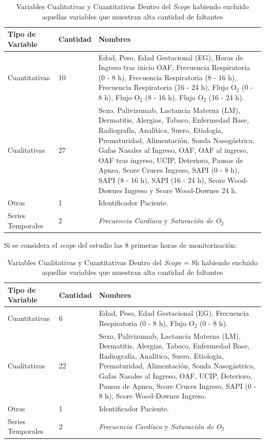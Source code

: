 \begin{table}[H]
    \centering
        \begin{tabular}{| m{5cm} | m{1.75cm} | m{7cm} |}
            \hline Tipo de Variable & Cantidad & Nombres  \\ \hline
            Cuantitativas & 10 & Edad, Peso, Edad Gestacional (EG), Horas de Ingreso tras inicio OAF, Frecuencia Respiratoria (0 - 8 h), Frecuencia Respiratoria (8 - 16 h),
            Frecuencia Respiratoria (16 - 24 h),
            Flujo O$_2$ (0 - 8 h),
            Flujo O$_2$ (8 - 16 h),
            Flujo O$_2$ (16 - 24 h). \\ \hline
            Cualitativas & 27 & Sexo, Palivizumab, Lactancia Materna (LM), Dermatitis, Alergias, Tabaco, Enfermedad Base, Radiografía, Analítica, Suero, Etiología, Prematuridad, Alimentación, Sonda Nasogástrica, Gafas Nasales al Ingreso, OAF, OAF al ingreso, OAF tras ingreso, UCIP, Deterioro, Pausas de Apnea, Score Cruces Ingreso, SAPI (0 - 8 h),
            SAPI (8 - 16 h), 
            SAPI (16 - 24 h), Score Wood-Downes Ingreso y Score Wood-Downes 24 h. \\ \hline
            Otras & 1 & Identificador Paciente. \\ \hline
            Series Temporales & 2 & \textit{Frecuencia Cardíaca} y \textit{Saturación de O$_2$} \\ 
            \hline
        \end{tabular}
    \caption{Variables Cualitativas y Cuantitativas Dentro del \textit{Scope} habiendo excluido aquellas variables que muestran alta cantidad de faltantes}
    \label{tabla:variables_estudio_final}
\end{table}

Si se considera el \textit{scope} del estudio las 8 primeras horas de monitorización: 

\begin{table}[H]
    \centering
        \begin{tabular}{| m{5cm} | m{1.75cm} | m{7cm} |}
            \hline Tipo de Variable & Cantidad & Nombres  \\ \hline
            Cuantitativas & 6 & Edad, Peso, Edad Gestacional (EG), Frecuencia Respiratoria (0 - 8 h),
            Flujo O$_2$ (0 - 8 h). \\ \hline
            Cualitativas & 22 & Sexo, Palivizumab, Lactancia Materna (LM), Dermatitis, Alergias, Tabaco, Enfermedad Base, Radiografía, Analítica, Suero, Etiología, Prematuridad, Alimentación, Sonda Nasogástrica, Gafas Nasales al Ingreso, OAF, UCIP, Deterioro, Pausas de Apnea, Score Cruces Ingreso, SAPI (0 - 8 h), Score Wood-Downes Ingreso. \\ \hline
            Otras & 1 & Identificador Paciente. \\ \hline
            Series Temporales & 2 & \textit{Frecuencia Cardíaca} y \textit{Saturación de O$_2$} \\ 
            \hline
        \end{tabular}
    \caption{Variables Cualitativas y Cuantitativas Dentro del \textit{Scope} = 8h habiendo excluido aquellas variables que muestran alta cantidad de faltantes}
    \label{tabla:variables_estudio_final_2}
\end{table}



